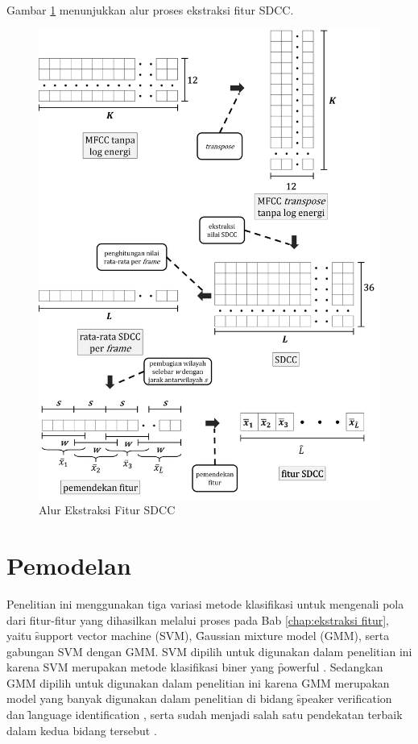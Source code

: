 \begin{enumerate}
  Gambar \ref{fig:alurekstraksifitursdcc} menunjukkan alur proses ekstraksi fitur SDCC.
  \begin{figure}
    \centering
    \includegraphics[width=\linewidth]{pics/ekstraksi_sdcc_v2}
    \caption{Alur Ekstraksi Fitur SDCC}
    \label{fig:alurekstraksifitursdcc}
  \end{figure}
\end{enumerate}



\section{Pemodelan} \label{chap:pemodelan}
Penelitian ini menggunakan tiga variasi metode klasifikasi untuk mengenali pola dari fitur-fitur yang dihasilkan melalui proses pada Bab \ref{chap:ekstraksi fitur}, yaitu \f{support vector machine} (SVM), \f{Gaussian mixture model} (GMM), serta gabungan SVM dengan GMM. SVM dipilih untuk digunakan dalam penelitian ini karena SVM merupakan metode klasifikasi biner yang \f{powerful} \citep{bishop2006pattern}. Sedangkan GMM dipilih untuk digunakan dalam penelitian ini karena GMM merupakan model yang banyak digunakan dalam penelitian di bidang \f{speaker verification} \citep{reynolds2000speaker} dan \f{language identification} \citep{torres2002approaches}, serta sudah menjadi salah satu pendekatan terbaik dalam kedua bidang tersebut \citep{zahra2013unique}.

